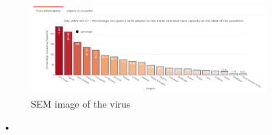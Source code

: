 \documentclass[
12pt, %
a4paper, %
oneside, %
headinclude,footinclude, %
BCOR5mm, %
]{scrartcl}
\begin{document}
\begin{figure}[H]
\begin{subfigure}{.5\textwidth}
  \caption{}
  \label{fig:Inspection_test_tracking}
\end{subfigure} 
\begin{subfigure}{.5\textwidth}
  \centering
  \includegraphics[width=1\linewidth]{Figures/Inspection_Cattura.png} 
  \caption{SEM image of the virus}
  \label{fig:Inspection_Cattura}
\end{subfigure} 
\caption{•}
\end{figure}
\end{document}
